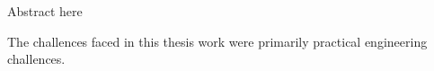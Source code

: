 \makecoverpage
\makecopyrightpage

\begin{abstractpage}[english]
Abstract here
\end{abstractpage}

The challences faced in this thesis work were primarily practical engineering challences.

\newpage

\setcounter{tocdepth}{2}
\thesistableofcontents
